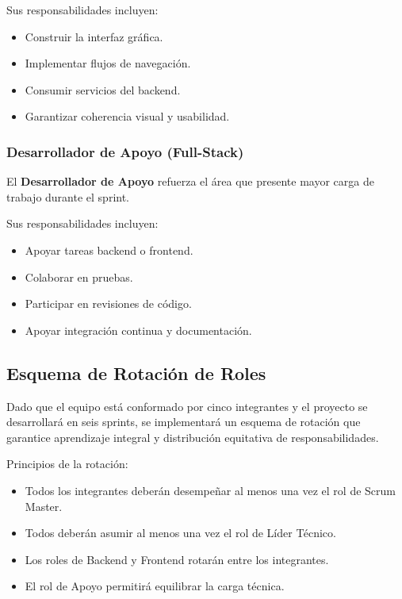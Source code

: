 \documentclass[12pt]{article}
\begin{document}
Sus responsabilidades incluyen:

\begin{itemize}
    \item Construir la interfaz gráfica.
    \item Implementar flujos de navegación.
    \item Consumir servicios del backend.
    \item Garantizar coherencia visual y usabilidad.
\end{itemize}

\subsubsection{Desarrollador de Apoyo (Full-Stack)}

El \textbf{Desarrollador de Apoyo} refuerza el área que presente mayor carga de trabajo durante el sprint.

Sus responsabilidades incluyen:

\begin{itemize}
    \item Apoyar tareas backend o frontend.
    \item Colaborar en pruebas.
    \item Participar en revisiones de código.
    \item Apoyar integración continua y documentación.
\end{itemize}

\subsection{Esquema de Rotación de Roles}

Dado que el equipo está conformado por cinco integrantes y el proyecto se desarrollará en seis sprints, se implementará un esquema de rotación que garantice aprendizaje integral y distribución equitativa de responsabilidades.

Principios de la rotación:

\begin{itemize}
    \item Todos los integrantes deberán desempeñar al menos una vez el rol de Scrum Master.
    \item Todos deberán asumir al menos una vez el rol de Líder Técnico.
    \item Los roles de Backend y Frontend rotarán entre los integrantes.
    \item El rol de Apoyo permitirá equilibrar la carga técnica.
\end{itemize}
\end{document}
